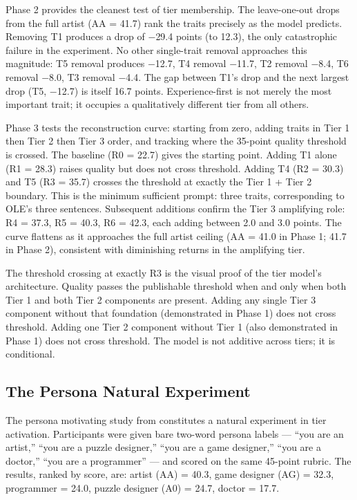 Phase 2 provides the cleanest test of tier membership. The leave-one-out drops from the
full artist (AA = 41.7) rank the traits precisely as the model predicts. Removing T1
produces a drop of $-$29.4 points (to 12.3), the only catastrophic failure in the
experiment. No other single-trait removal approaches this magnitude: T5 removal produces
$-$12.7, T4 removal $-$11.7, T2 removal $-$8.4, T6 removal $-$8.0, T3 removal $-$4.4.
The gap between T1's drop and the next largest drop (T5, $-$12.7) is itself 16.7 points.
Experience-first is not merely the most important trait; it occupies a qualitatively
different tier from all others.

Phase 3 tests the reconstruction curve: starting from zero, adding traits in Tier 1
then Tier 2 then Tier 3 order, and tracking where the 35-point quality threshold is
crossed. The baseline (R0 = 22.7) gives the starting point. Adding T1 alone (R1 = 28.3)
raises quality but does not cross threshold. Adding T4 (R2 = 30.3) and T5 (R3 = 35.7)
crosses the threshold at exactly the Tier 1 + Tier 2 boundary. This is the minimum
sufficient prompt: three traits, corresponding to OLE's three sentences. Subsequent
additions confirm the Tier 3 amplifying role: R4 = 37.3, R5 = 40.3, R6 = 42.3, each
adding between 2.0 and 3.0 points. The curve flattens as it approaches the full artist
ceiling (AA = 41.0 in Phase 1; 41.7 in Phase 2), consistent with diminishing returns in
the amplifying tier.

The threshold crossing at exactly R3 is the visual proof of the tier model's architecture.
Quality passes the publishable threshold when and only when both Tier 1 and both Tier 2
components are present. Adding any single Tier 3 component without that foundation
(demonstrated in Phase 1) does not cross threshold. Adding one Tier 2 component without
Tier 1 (also demonstrated in Phase 1) does not cross threshold. The model is not
additive across tiers; it is conditional.

\subsection{The Persona Natural Experiment}

The persona motivating study from \citeauthor{paper3} \cite{paper3} constitutes a natural
experiment in tier activation. Participants were given bare two-word persona labels ---
``you are an artist,'' ``you are a puzzle designer,'' ``you are a game designer,'' ``you
are a doctor,'' ``you are a programmer'' --- and scored on the same 45-point rubric. The
results, ranked by score, are: artist (AA) = 40.3, game designer (AG) = 32.3, programmer
= 24.0, puzzle designer (A0) = 24.7, doctor = 17.7.


